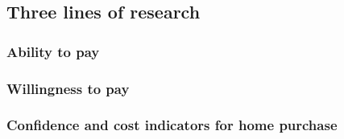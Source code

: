 \documentclass[
]{article}
\begin{document}
\hypertarget{three-lines-of-research}{%
\subsection{Three lines of research}\label{three-lines-of-research}}

\hypertarget{ability-to-pay}{%
\subsubsection{Ability to pay}\label{ability-to-pay}}

\hypertarget{willingness-to-pay}{%
\subsubsection{Willingness to pay}\label{willingness-to-pay}}

\hypertarget{confidence-and-cost-indicators-for-home-purchase}{%
\subsubsection{Confidence and cost indicators for home
purchase}\label{confidence-and-cost-indicators-for-home-purchase}}
\end{document}
